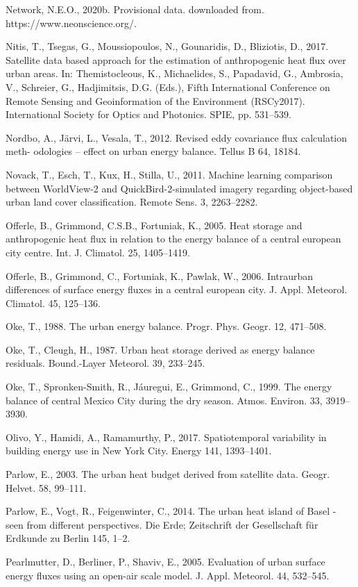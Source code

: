 \documentclass[3p,times]{elsarticle}
\begin{document}
Network, N.E.O., 2020b. Provisional data. downloaded from. https://www.neonscience.org/.

Nitis, T., Tsegas, G., Moussiopoulos, N., Gounaridis, D., Bliziotis, D., 2017. Satellite data based approach for the estimation of anthropogenic heat flux over urban areas. In: Themistocleous, K., Michaelides, S., Papadavid, G., Ambrosia, V., Schreier, G., Hadjimitsis, D.G. (Eds.), Fifth International Conference on Remote Sensing and Geoinformation of the Environment (RSCy2017). International Society for Optics and Photonics. SPIE, pp. 531–539.

Nordbo, A., Järvi, L., Vesala, T., 2012. Revised eddy covariance flux calculation meth- odologies – effect on urban energy balance. Tellus B 64, 18184.

Novack, T., Esch, T., Kux, H., Stilla, U., 2011. Machine learning comparison between WorldView-2 and QuickBird-2-simulated imagery regarding object-based urban land cover classification. Remote Sens. 3, 2263–2282.

Offerle, B., Grimmond, C.S.B., Fortuniak, K., 2005. Heat storage and anthropogenic heat flux in relation to the energy balance of a central european city centre. Int. J. Climatol. 25, 1405–1419.

Offerle, B., Grimmond, C., Fortuniak, K., Pawlak, W., 2006. Intraurban differences of surface energy fluxes in a central european city. J. Appl. Meteorol. Climatol. 45, 125–136.

Oke, T., 1988. The urban energy balance. Progr. Phys. Geogr. 12, 471–508.

Oke, T., Cleugh, H., 1987. Urban heat storage derived as energy balance residuals. Bound.-Layer Meteorol. 39, 233–245.

Oke, T., Spronken-Smith, R., Jáuregui, E., Grimmond, C., 1999. The energy balance of central Mexico City during the dry season. Atmos. Environ. 33, 3919–3930.

Olivo, Y., Hamidi, A., Ramamurthy, P., 2017. Spatiotemporal variability in building energy use in New York City. Energy 141, 1393–1401.

Parlow, E., 2003. The urban heat budget derived from satellite data. Geogr. Helvet. 58, 99–111.

Parlow, E., Vogt, R., Feigenwinter, C., 2014. The urban heat island of Basel - seen from different perspectives. Die Erde; Zeitschrift der Gesellschaft für Erdkunde zu Berlin 145, 1–2.

Pearlmutter, D., Berliner, P., Shaviv, E., 2005. Evaluation of urban surface energy fluxes using an open-air scale model. J. Appl. Meteorol. 44, 532–545.
\end{document}

